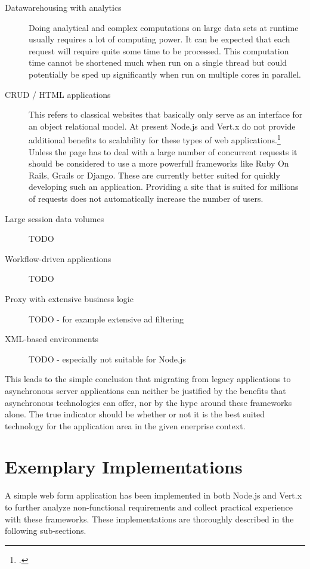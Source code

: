 \begin{description}
  \item[Datawarehousing with analytics] Doing analytical and complex computations
  	on large data sets at runtime usually requires a lot of computing power.
  	It can be expected that each request will require quite some time to be processed.
  	This computation time cannot be shortened much when run on a single thread but 
  	could potentially be sped up significantly when run on multiple cores in parallel. 
  \item[CRUD / HTML applications] 
	This refers to classical websites that basically only serve as an interface for
	an object relational model.
	At present Node.js and Vert.x do not provide additional benefits to scalability
	for these types of web applications.\footcite[Cf.][15]{Roden_2012} Unless the page has to deal with a large number of
	concurrent requests it should be considered to use a more powerfull frameworks
	like Ruby On Rails, Grails or Django. These are currently better suited for quickly
	developing such an application. Providing a site that is suited for 
	millions of requests does not automatically increase the number of users.
  \item[Large session data volumes] TODO
  \item[Workflow-driven applications] TODO
  \item[Proxy with extensive business logic] TODO - for example extensive ad filtering
  \item[XML-based environments] TODO - especially not suitable for Node.js
\end{description}

This leads to the simple conclusion that migrating from legacy applications to asynchronous
server applications can neither be justified by the benefits that asynchronous technologies
can offer, nor by the hype around these frameworks alone. The true indicator should be whether
or not it is the best suited technology for the application area in the given enerprise context.
    


\newpage
\section{Exemplary Implementations}
\label{exemplary_implementations}

A simple web form application has been implemented in both Node.js and Vert.x to
further analyze non-functional requirements and collect practical experience
with these frameworks. These implementations are thoroughly described in the following sub-sections.

